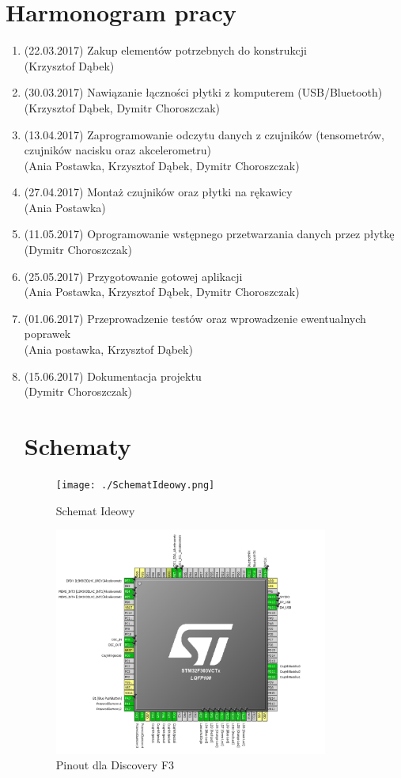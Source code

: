\documentclass[12pt,a4paper]{article}
\begin{document}
\section{Harmonogram pracy}
\begin{enumerate}
\item (22.03.2017) Zakup elementów potrzebnych do konstrukcji \\(Krzysztof Dąbek)
\item (30.03.2017) Nawiązanie łączności płytki z komputerem (USB/Bluetooth) \\(Krzysztof Dąbek, Dymitr Choroszczak)
\item (13.04.2017) Zaprogramowanie odczytu danych z czujników (tensometrów, czujników nacisku oraz akcelerometru) \\(Ania Postawka, Krzysztof Dąbek, Dymitr Choroszczak) 
\item (27.04.2017) Montaż czujników oraz płytki na rękawicy \\(Ania Postawka)
\item (11.05.2017) Oprogramowanie wstępnego przetwarzania danych przez płytkę \\(Dymitr Choroszczak) 
\item (25.05.2017) Przygotowanie gotowej aplikacji \\(Ania Postawka, Krzysztof Dąbek, Dymitr Choroszczak)
\item (01.06.2017) Przeprowadzenie testów oraz wprowadzenie ewentualnych poprawek \\(Ania postawka, Krzysztof Dąbek)
\item (15.06.2017) Dokumentacja projektu \\(Dymitr Choroszczak)

\section{Schematy}
\begin{figure}[!htb]
\texttt{[image: ./SchematIdeowy.png]}
\caption{Schemat Ideowy}
\end{figure}
\begin{figure}[!htb]
\centering
\includegraphics[width=0.85\textwidth]{./pinout.png}
\caption{Pinout dla Discovery F3}
\end{figure}
\end{enumerate}
\end{document}
